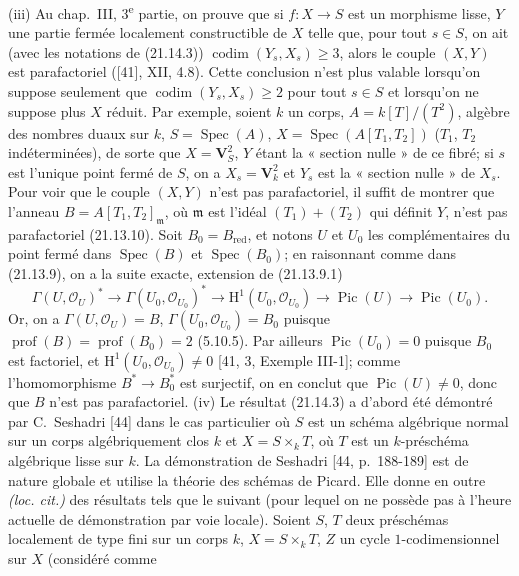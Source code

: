\begin{env}[21.14.4]
(iii) Au chap.~III, 3\textsuperscript{e} partie, on prouve que si $f:X\to S$ est un
morphisme lisse, $Y$ une partie fermée localement constructible de $X$ telle que,
pour tout $s\in S$, on ait (avec les notations de (21.14.3))
$\operatorname{codim}(Y_s,X_s)\geq3$, alors le couple $(X,Y)$ est parafactoriel
([41], XII, 4.8). Cette conclusion n'est plus valable lorsqu'on suppose seulement que
$\operatorname{codim}(Y_s,X_s)\geq2$ pour tout $s\in S$ et lorsqu'on ne suppose plus
$X$ réduit. Par exemple, soient $k$ un corps, $A=k[T]/(T^2)$, algèbre des nombres
duaux sur $k$, $S=\operatorname{Spec}(A)$,
$X=\operatorname{Spec}(A[T_1,T_2])$ ($T_1$, $T_2$ indéterminées), de sorte que
$X=\mathbf V_S^2$, $Y$ étant la « section nulle » de ce fibré; si $s$ est l'unique
point fermé de $S$, on a $X_s=\mathbf V_k^2$ et $Y_s$ est la « section nulle » de
$X_s$. Pour voir que le couple $(X,Y)$ n'est pas parafactoriel, il suffit de montrer
que l'anneau $B=A[T_1,T_2]_\mathfrak m$, où $\mathfrak m$ est l'idéal
$(T_1)+(T_2)$ qui définit $Y$, n'est pas parafactoriel (21.13.10). Soit
$B_0=B_{\mathrm{red}}$, et notons $U$ et $U_0$ les complémentaires du point fermé
dans $\operatorname{Spec}(B)$ et $\operatorname{Spec}(B_0)$; en raisonnant comme
dans (21.13.9), on a la suite exacte, extension de (21.13.9.1)
\[
  \Gamma(U,\mathcal O_U)^*\longrightarrow\Gamma(U_0,\mathcal O_{U_0})^*
  \longrightarrow\mathrm H^1(U_0,\mathcal O_{U_0})
  \longrightarrow\operatorname{Pic}(U)\longrightarrow\operatorname{Pic}(U_0).
\]
Or, on a $\Gamma(U,\mathcal O_U)=B$, $\Gamma(U_0,\mathcal O_{U_0})=B_0$ puisque
$\operatorname{prof}(B)=\operatorname{prof}(B_0)=2$ (5.10.5). Par ailleurs
$\operatorname{Pic}(U_0)=0$ puisque $B_0$ est factoriel, et
$\mathrm H^1(U_0,\mathcal O_{U_0})\neq0$ [41, 3, Exemple III-1]; comme
l'homomorphisme $B^*\to B_0^*$ est surjectif, on en conclut que
$\operatorname{Pic}(U)\neq0$, donc que $B$ n'est pas parafactoriel.
(iv) Le résultat (21.14.3) a d'abord été démontré par C.~Seshadri [44] dans le cas
particulier où $S$ est un schéma algébrique normal sur un corps algébriquement clos
$k$ et $X=S\times_k T$, où $T$ est un $k$-préschéma algébrique lisse sur $k$. La
démonstration de Seshadri [44, p.~188-189] est de nature globale et utilise la
théorie des schémas de Picard. Elle donne en outre \emph{(loc. cit.)} des résultats
tels que le suivant (pour lequel on ne possède pas à l'heure actuelle de démonstration
par voie locale). Soient $S$, $T$ deux préschémas localement de type fini sur un
corps $k$, $X=S\times_k T$, $Z$ un cycle $1$-codimensionnel sur $X$ (considéré comme

\end{env}

